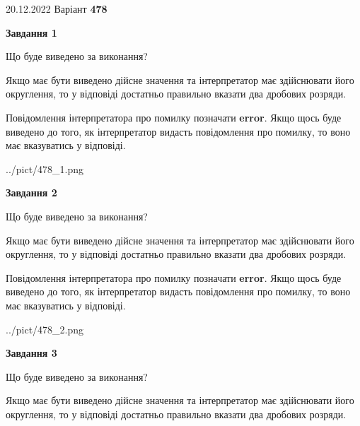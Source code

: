 \documentclass[12pt, ukrainian]{article}
\begin{document}
{20.12.2022 Варіант \No \textbf { 478 }\par}
{
\begin {Large}

{\begin {center}\textbf{Завдання 1}\end {center}}\par
Що буде виведено за виконання? \par

Якщо має бути виведено дійсне значення та інтерпретатор має здійснювати його округлення, 
то у відповіді достатньо правильно вказати два дробових розряди.

Повідомлення інтерпретатора про помилку позначати \textbf{error}.
Якщо щось буде виведено до того, як інтерпретатор видасть повідомлення про помилку, 
то воно має вказуватись у відповіді. \par

\begin{center}
	{../pict/478_1.png}
\end{center}
\newpage

{\begin {center}\textbf{Завдання 2}\end {center}}\par
Що буде виведено за виконання? \par

Якщо має бути виведено дійсне значення та інтерпретатор має здійснювати його округлення, 
то у відповіді достатньо правильно вказати два дробових розряди.

Повідомлення інтерпретатора про помилку позначати \textbf{error}.
Якщо щось буде виведено до того, як інтерпретатор видасть повідомлення про помилку, 
то воно має вказуватись у відповіді. \par

\begin{center}
	{../pict/478_2.png}
\end{center}
\newpage

{\begin {center}\textbf{Завдання 3}\end {center}}\par
Що буде виведено за виконання? \par

Якщо має бути виведено дійсне значення та інтерпретатор має здійснювати його округлення, 
то у відповіді достатньо правильно вказати два дробових розряди.


\end{Large}}
\end{document}

